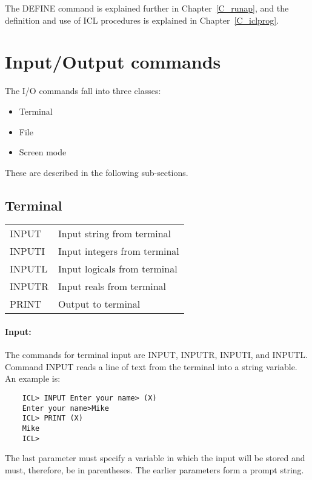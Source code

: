 The DEFINE command is explained further in Chapter~\ref{C_runap}, and the
definition and use of ICL procedures is explained in Chapter~\ref{C_iclprog}.

\section{Input/Output commands}
\label{S_IO}

The I/O commands fall into three classes:
\begin{itemize}
\item Terminal
\item File
\item Screen mode
\end{itemize}
These are described in the following sub-sections.

\subsection{Terminal}

\begin{center}
\begin{tabular}{|l|l|}
\hline
INPUT  & Input string from terminal \\
INPUTI & Input integers from terminal \\
INPUTL & Input logicals from terminal \\
INPUTR & Input reals from terminal \\
\hline
PRINT  & Output to terminal \\
\hline
\end{tabular}
\end{center}

\paragraph{Input:}\hfill

The commands for terminal input are INPUT, INPUTR, INPUTI, and INPUTL.
Command INPUT reads a line of text from the terminal into a string variable.
An example is:

\begin{small}
\begin{verbatim}
    ICL> INPUT Enter your name> (X)
    Enter your name>Mike
    ICL> PRINT (X)
    Mike
    ICL>
\end{verbatim}
\end{small}

The last parameter must specify a variable in which the input will be stored
and must, therefore, be in parentheses.
The earlier parameters form a prompt string.

